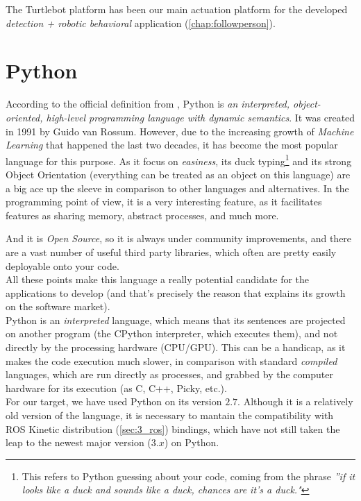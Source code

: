 		The Turtlebot platform has been our main actuation platform for the developed \emph{detection + robotic behavioral} application (\autoref{chap:followperson}).\\
			

\section{Python}
	According to the official definition from \cite{python}, Python is \textit{an interpreted, object-oriented, high-level programming language with dynamic semantics}. It was created in 1991 by Guido van Rossum. However, due to the increasing growth of \emph{Machine Learning} that happened the last two decades, it has become the most popular language for this purpose. As it focus on \emph{easiness}, its duck typing\footnote{This refers to Python guessing about your code, coming from the phrase \textit{''if it looks like a duck and sounds like a duck, chances are it's a duck."}} and its strong Object Orientation (everything can be treated as an object on this language) are a big ace up the sleeve in comparison to other languages and alternatives. In the programming point of view, it is a very interesting feature, as it facilitates features as sharing memory, abstract processes, and much more.
	
	And it is \textit{Open Source}, so it is always under community improvements, and there are a vast number of useful third party libraries, which often are pretty easily deployable onto your code.\\
	
	All these points make this language a really potential candidate for the applications to develop (and that's precisely the reason that explains its  growth on the software market).\\
	
	Python is an \emph{interpreted} language, which means that its sentences are projected on another program (the CPython interpreter, which executes them), and not directly by the processing hardware (CPU/GPU). This can be a handicap, as it makes the code execution much slower, in comparison with standard \emph{compiled} languages, which are run directly as processes, and grabbed by the computer hardware for its execution (as C, C++, Picky, etc.).\\
	
	For our target, we have used Python on its version $2.7$. Although it is a relatively old version of the language, it is necessary to mantain the compatibility with ROS Kinetic distribution  (\autoref{sec:3_ros}) bindings, which have not still taken the leap to the newest major version ($3.x$) on Python.\\
	


